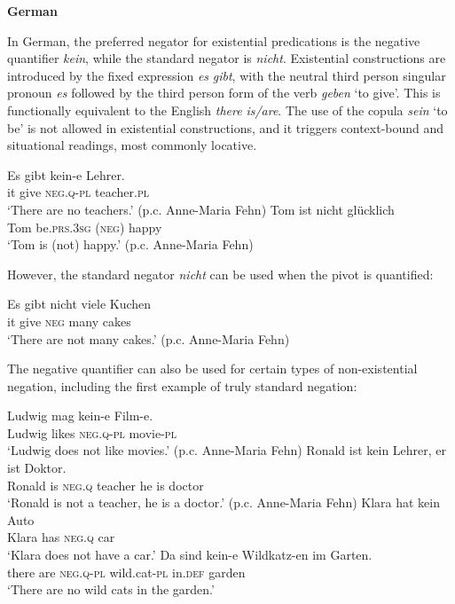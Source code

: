 ﻿\documentclass[output=paper]{langsci/langscibook}
\begin{document}
\begin{unindented}
\textbf{German}

In German, the preferred negator for existential predications is the negative quantifier \textit{kein}, while the standard negator is \textit{nicht}. Existential constructions are introduced by the fixed expression \textit{es} \textit{gibt}, with the neutral third person singular pronoun \textit{es} followed by the third person form of the verb \textit{geben} `to give'. This is functionally equivalent to the English \textit{there} \textit{is/are}. The use of the copula \textit{sein} `to be' is not allowed in existential constructions, and it triggers context-bound and situational readings, most commonly locative. 
%
\begin{exe}\ex \gll Es gibt  kein-e Lehrer.  \\
it   give \textsc{neg.q-pl} teacher.\textsc{pl} \\
    \glt `There are no teachers.' (p.c. Anne-Maria Fehn)
\ex \gll Tom ist {\op}nicht{\cp} glücklich \\
Tom be.\textsc{prs.3sg} (\textsc{neg}) happy \\
    \glt `Tom is (not) happy.' (p.c. Anne-Maria Fehn)
    \end{exe}

However, the standard negator \textit{nicht} can be used when the pivot is quantified:
%
\begin{exe}\ex \gll Es gibt nicht viele   Kuchen \\
it   give \textsc{neg}  many cakes \\
    \glt `There are not many cakes.' (p.c. Anne-Maria Fehn)
    \end{exe}

The negative quantifier can also be used for certain types of non-existential negation, including the first example of truly standard negation:
%
\begin{exe}\ex \gll Ludwig mag kein-e Film-e.  \\
Ludwig likes \textsc{neg.q-pl} movie-\textsc{pl} \\
    \glt `Ludwig does not like movies.' (p.c. Anne-Maria Fehn)
\ex \gll Ronald ist kein Lehrer, er ist Doktor.  \\
Ronald is  \textsc{neg.q} teacher he is doctor \\
    \glt `Ronald is not a teacher, he is a doctor.' (p.c. Anne-Maria Fehn)
\ex \gll Klara hat kein Auto \\
Klara has \textsc{neg.q} car \\
    \glt `Klara does not have a car.'
\ex \gll Da sind kein-e Wildkatz-en im Garten.  \\
there are \textsc{neg.q-pl} wild.cat-\textsc{pl} in.\textsc{def} garden \\
    \glt `There are no wild cats in the garden.'
    \end{exe}


\end{unindented}
\end{document}
